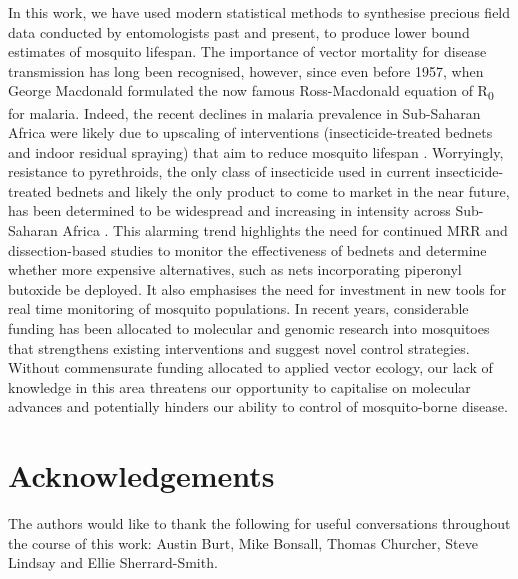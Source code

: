 \documentclass[]{article}
\begin{document}
In this work, we have used modern statistical methods to synthesise precious field data conducted by entomologists past and present, to produce lower bound estimates of mosquito lifespan. The importance of vector mortality for disease transmission has long been recognised, however,
since even before 1957, when George Macdonald formulated the
now famous Ross-Macdonald equation of R\textsubscript{0} for malaria. Indeed, the recent declines in malaria prevalence in Sub-Saharan Africa were likely due to upscaling of interventions (insecticide-treated bednets and indoor residual spraying) that aim to reduce mosquito lifespan \citep{bhatt2015effect}. Worryingly, resistance to pyrethroids, the only class of insecticide used in current insecticide-treated bednets and likely the only product to come to market in the near
future, has been determined to be widespread and increasing in intensity
across Sub-Saharan Africa \citep{world2018global}. This alarming trend
highlights the need for continued MRR and dissection-based studies to
monitor the effectiveness of bednets and determine whether more
expensive alternatives, such as nets incorporating piperonyl butoxide be
deployed. It also emphasises the need for investment in new tools for
real time monitoring of mosquito populations. In recent years, considerable funding has been allocated to molecular and genomic research
into mosquitoes that strengthens existing interventions and suggest
novel control strategies. Without commensurate funding allocated to
applied vector ecology, our lack of knowledge in this area threatens our
opportunity to capitalise on molecular advances and potentially hinders
our ability to control of mosquito-borne disease.

\section{Acknowledgements}\label{acknowledgements}

The authors would like to thank the following for useful conversations
throughout the course of this work: Austin Burt, Mike Bonsall, Thomas Churcher, Steve
Lindsay and Ellie Sherrard-Smith.

\printbibliography
\end{document}

